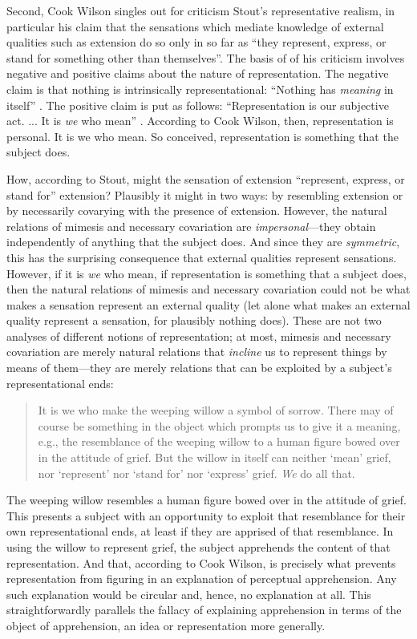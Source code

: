 Second, Cook Wilson singles out for criticism Stout’s \citeyearpar[144]{Stout:1903zl} representative realism, in particular his claim that the sensations which mediate knowledge of external qualities such as extension do so only in so far as ``they represent, express, or stand for something other than themselves''. The basis of of his criticism involves negative and positive claims about the nature of representation. The negative claim is that nothing is intrinsically representational: ``Nothing has \emph{meaning} in itself'' \citep[770]{Cook-Wilson:1926sf}. The positive claim is put as follows: ``Representation is our subjective act. ... It is \emph{we} who mean'' \citep[770]{Cook-Wilson:1926sf}. According to Cook Wilson, then, representation is personal. It is we who mean. So conceived, representation is something that the subject does. 

How, according to Stout, might the sensation of extension ``represent, express, or stand for'' extension? Plausibly it might in two ways: by resembling extension or by necessarily covarying with the presence of extension. However, the natural relations of mimesis and necessary covariation are \emph{impersonal}---they obtain independently of anything that the subject does. And since they are \emph{symmetric}, this has the surprising consequence that external qualities represent sensations. However, if it is \emph{we} who mean, if representation is something that a subject does, then the natural relations of mimesis and necessary covariation could not be what makes a sensation represent an external quality (let alone what makes an external quality represent a sensation, for plausibly nothing does). These are not two analyses of different notions of representation; at most, mimesis and necessary covariation are merely natural relations that \emph{incline} us to represent things by means of them---they are merely relations that can be exploited by a subject's representational ends:
\begin{quote}
	It is we who make the weeping willow a symbol of sorrow. There may of course be something in the object which prompts us to give it a meaning, e.g., the resemblance of the weeping willow to a human figure bowed over in the attitude of grief. But the willow in itself can neither `mean' grief, nor `represent' nor `stand for' nor `express' grief. \emph{We} do all that.  \citep[770]{Cook-Wilson:1926sf}
\end{quote}
The weeping willow resembles a human figure bowed over in the attitude of grief. This presents a subject with an opportunity to exploit that resemblance for their own representational ends, at least if they are apprised of that resemblance. In using the willow to represent grief, the subject apprehends the content of that representation. And that, according to Cook Wilson, is precisely what prevents representation from figuring in an explanation of perceptual apprehension. Any such explanation would be circular and, hence, no explanation at all. This straightforwardly parallels the fallacy of explaining apprehension in terms of the object of apprehension, an idea or representation more generally.

